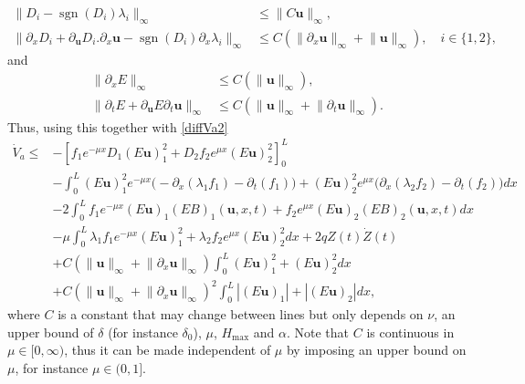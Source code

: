 \documentclass[JEP,XML,SOM,Unicode]{cedram}
\DeclareMathOperator{\sgn}{sgn}
\theoremstyle{definition}
\begin{document}
\begin{align*}
\lVert D_{i}-\sgn(D_{i})\lambda_{i}\rVert_{\infty}&\leq \lVert C\boldsymbol{u}\rVert_{\infty},
\\
\lVert\partial_{x}D_{i}+\partial_{\boldsymbol{u}}D_{i}.\partial_{x}\boldsymbol{u}-\sgn(D_{i})\partial_{x}\lambda_{i}\rVert_{\infty}&\leq C(\lVert \partial_{x}\boldsymbol{u}\rVert_{\infty}+\lVert \boldsymbol{u}\rVert_{\infty}),\quad i\in\{1,2\},
\end{align*}
and
\begin{align*}
\lVert\partial_{x}E\rVert_{\infty}&\leq C(\lVert \boldsymbol{u}\rVert_{\infty}),\\
\lVert\partial_{t}E+\partial_{\boldsymbol{u}}E\partial_{t}\boldsymbol{u}\rVert_{\infty}&\leq C(\lVert \boldsymbol{u}\rVert_{\infty}+\lVert \partial_{t} \boldsymbol{u}\rVert_{\infty}).
\end{align*}
Thus, using this together with \eqref{diffVa2}
\begin{equation*}
\begin{split}
\dot V_{a}\leq& -\left[f_{1}e^{-\mu x}D_{1}(E\boldsymbol{u})_{1}^{2}+D_{2}f_{2}e^{\mu x}(E\boldsymbol{u})_{2}^{2}\right]_{0}^{L}\\
&-\int_{0}^{L}(E\boldsymbol{u})_{1}^{2}e^{-\mu x}\bigl(-\partial_{x}(\lambda_{1}f_{1})-\partial_{t}(f_{1})\bigr)+(E\boldsymbol{u})_{2}^{2}e^{\mu x}\bigl(\partial_{x}(\lambda_{2}f_{2})-\partial_{t}(f_{2})\bigr)dx\\
&-2\int_{0}^{L}f_{1}e^{-\mu x}(E\boldsymbol{u})_{1}(EB)_{1}(\boldsymbol{u},x,t)+f_{2}e^{\mu x}(E\boldsymbol{u})_{2}(EB)_{2}(\boldsymbol{u},x,t)dx\\
&-\mu\int_{0}^{L}\lambda_{1}f_{1}e^{-\mu x}(E\boldsymbol{u})_{1}^{2}+\lambda_{2}f_{2}e^{\mu x}(E\boldsymbol{u})_{2}^{2}dx
+2qZ(t)\dot Z(t)\\
&+C\left(\lVert \boldsymbol{u}\rVert_{\infty}+\lVert \partial_{x} \boldsymbol{u}\rVert_{\infty}\right)\int_{0}^{L}(E\boldsymbol{u})_{1}^{2}+(E\boldsymbol{u})_{2}^{2} dx\\
&+C\left(\lVert \boldsymbol{u}\rVert_{\infty}+\lVert \partial_{x} \boldsymbol{u}\rVert_{\infty}\right)^{2}\int_{0}^{L}|(E\boldsymbol{u})_{1}|+|(E\boldsymbol{u})_{2}|dx,
\end{split}
\end{equation*}
where $C$ is a constant that may change between lines but
only depends on $\nu$, an upper bound of $\delta$ (for instance $\delta_{0}$), $\mu$, $H_{\max}$ and $\alpha$. Note that $C$ is continuous in $\mu\in[0,\infty)$, thus it can be made independent of $\mu$ by imposing an upper bound on $\mu$, for instance $\mu\in(0,1]$.
\end{document}
